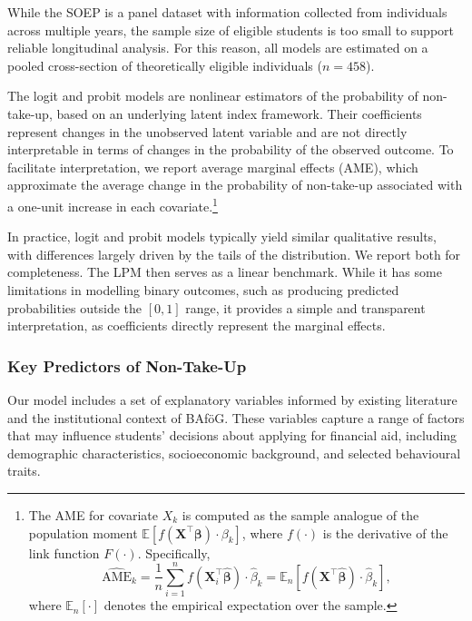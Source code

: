 While the SOEP is a panel dataset with information collected from individuals across multiple years, the sample size of eligible students is too small to support reliable longitudinal analysis. For this reason, all models are estimated on a pooled cross-section of theoretically eligible individuals (\( n = 458 \)).

The logit and probit models are nonlinear estimators of the probability of non-take-up, based on an underlying latent index framework. 
Their coefficients represent changes in the unobserved latent variable and are not directly interpretable in terms of changes in the probability of the observed outcome. 
To facilitate interpretation, we report average marginal effects (AME), which approximate the average change in the probability of non-take-up associated with a one-unit increase in each covariate.\footnote{The AME for covariate \( X_k \) is computed as the sample analogue of the population moment \( \mathbb{E}[f(\mathbf{X}^\top \boldsymbol{\beta}) \cdot \beta_k] \), where \( f(\cdot) \) is the derivative of the link function \( F(\cdot) \). Specifically,
\[
    \widehat{\text{AME}}_k 
    = \frac{1}{n} \sum_{i=1}^n f(\mathbf{X}_i^\top \hat{\boldsymbol{\beta}}) \cdot \hat{\beta}_k
    = \mathbb{E}_n \left[ f(\mathbf{X}^\top \hat{\boldsymbol{\beta}}) \cdot \hat{\beta}_k \right],
\]
where \( \mathbb{E}_n[\cdot] \) denotes the empirical expectation over the sample.}

In practice, logit and probit models typically yield similar qualitative results, with differences largely driven by the tails of the distribution. We report both for completeness. The LPM then serves as a linear benchmark. While it has some limitations in modelling binary outcomes, such as producing predicted probabilities outside the \([0,1]\) range, it provides a simple and transparent interpretation, as coefficients directly represent the marginal effects.

\subsubsection{Key Predictors of Non-Take-Up}
Our model includes a set of explanatory variables informed by existing literature and the institutional context of BAföG. 
These variables capture a range of factors that may influence students' decisions about applying for financial aid, including demographic characteristics, socioeconomic background, and selected behavioural traits. 

